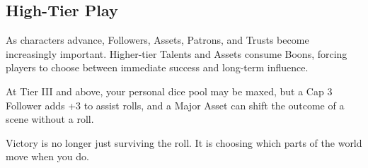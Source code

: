 \subsection{High-Tier Play}

As characters advance, Followers, Assets, Patrons, and Trusts become increasingly important. Higher-tier Talents and Assets consume Boons, forcing players to choose between immediate success and long-term influence.

At Tier III and above, your personal dice pool may be maxed, but a Cap 3 Follower adds +3 to assist rolls, and a Major Asset can shift the outcome of a scene without a roll.

Victory is no longer just surviving the roll. It is choosing which parts of the world move when you do.

